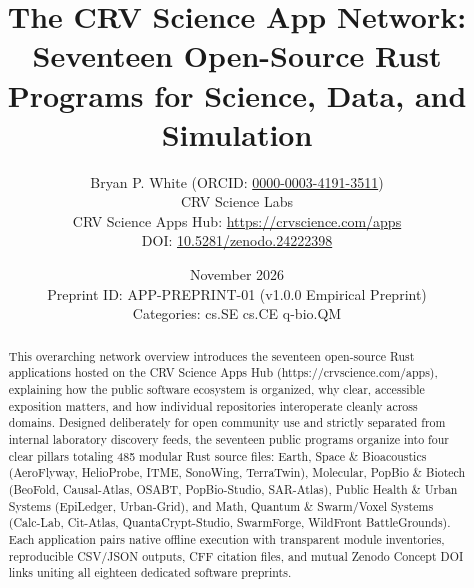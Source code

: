 \documentclass[10pt,letterpaper]{article}
\title{\textbf{The CRV Science App Network: Seventeen Open-Source Rust Programs for Science, Data, and Simulation}}
\author{Bryan P. White (ORCID: \href{https://orcid.org/0000-0003-4191-3511}{0000-0003-4191-3511}) \\ CRV Science Labs \\ \small CRV Science Apps Hub: \url{https://crvscience.com/apps} \\ \small DOI: \href{https://doi.org/10.5281/zenodo.24222398}{10.5281/zenodo.24222398}}
\date{November 2026 \\ \small Preprint ID: APP-PREPRINT-01 (v1.0.0 Empirical Preprint) \\ \small Categories: cs.SE \textbullet{} cs.CE \textbullet{} q-bio.QM}
\begin{document}
\maketitle

\begin{abstract}
This overarching network overview introduces the seventeen open-source Rust applications hosted on the CRV Science Apps Hub (https://crvscience.com/apps), explaining how the public software ecosystem is organized, why clear, accessible exposition matters, and how individual repositories interoperate cleanly across domains. Designed deliberately for open community use and strictly separated from internal laboratory discovery feeds, the seventeen public programs organize into four clear pillars totaling 485 modular Rust source files: Earth, Space \& Bioacoustics (AeroFlyway, HelioProbe, ITME, SonoWing, TerraTwin), Molecular, PopBio \& Biotech (BeoFold, Causal-Atlas, OSABT, PopBio-Studio, SAR-Atlas), Public Health \& Urban Systems (EpiLedger, Urban-Grid), and Math, Quantum \& Swarm/Voxel Systems (Calc-Lab, Cit-Atlas, QuantaCrypt-Studio, SwarmForge, WildFront BattleGrounds). Each application pairs native offline execution with transparent module inventories, reproducible CSV/JSON outputs, CFF citation files, and mutual Zenodo Concept DOI links uniting all eighteen dedicated software preprints.
\end{abstract}
\end{document}
